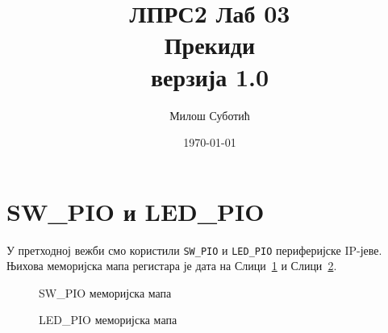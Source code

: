 \documentclass[12pt]{article}
\title{
	ЛПРС2 Лаб 03\\
	{\normalsize Прекиди}\\
	{\small верзија 1.0}
}
\author{Милош Суботић}
\date{\today}
\def\regWD{-4mm}
\def\regHO{-30mm}
\def\regH{-13mm}
\def\regRWO{\regH-0mm}
\def\regIVO{\regRWO-5mm}
\newcommand{\regBitLegend}[1]{%
	\node[anchor=south east] at (32*\regWD, #1*\regHO) {Bits};
}
\newcommand{\regBit}[2]{%
	\node[anchor=south] at (#2*\regWD+0.5*\regWD, #1*\regHO) {#2};
}
\newcommand{\regAddr}[2]{%
	\node[anchor=east] at (32*\regWD, #1*\regHO+0.5*\regH) {#2};
}
\newcommand{\regField}[4]{%
	\draw (#2*\regWD+\regWD, #1*\regHO) rectangle (#3*\regWD, #1*\regHO+\regH)
		node[pos=.5] {#4};
}
\newcommand{\regRWLegend}[1]{%
	\node[anchor=north east] at (32*\regWD, #1*\regHO+\regRWO) {Read/Write};
}
\newcommand{\regRW}[4]{%
	\node[anchor=north] at 
		(
			#2*0.5*\regWD + #3*0.5*\regWD + 0.5*\regWD,
			#1*\regHO+\regRWO
		)
		{#4};
}
\newcommand{\regInitLegend}[1]{%
	\node[anchor=north east] at (32*\regWD, #1*\regHO+\regIVO) {Inital Value};
}
\newcommand{\regInit}[4]{%
	\node[anchor=north] at 
		(
			#2*0.5*\regWD + #3*0.5*\regWD + 0.5*\regWD,
			#1*\regHO+\regIVO
		)
		{#4};
}
\newcommand{\regStd}[2]{%
	\regBitLegend{#1}
	\regAddr{#1}{#2}
	\regRWLegend{#1}
	\regInitLegend{#1}
	\regBit{#1}{31}
	\regBit{#1}{0}
}
\begin{document}
\sloppy %



\clearpage
\maketitle
\thispagestyle{empty}


\section{SW\_PIO и LED\_PIO}
\par
У претходној вежби смо користили \verb|SW_PIO| и \verb|LED_PIO|
периферијске IP-јеве.
Њихова меморијска мапа регистара је дата на
Слици~\ref{fig:sw_pio_mm} и Слици~\ref{fig:led_pio_mm}.

\begin{figure}[H]
	\centering
	
	\caption{\textsc{SW\_PIO} меморијска мапа}
	\label{fig:sw_pio_mm}
\end{figure}

\begin{figure}[H]
	\centering
	
	\caption{\textsc{LED\_PIO} меморијска мапа}
	\label{fig:led_pio_mm}
\end{figure}
\end{document}
